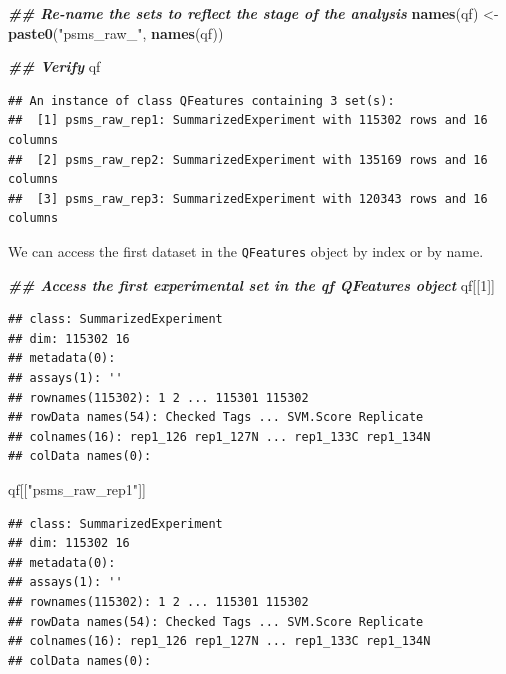 \documentclass[9pt,a4paper,]{extarticle}
\newenvironment{Shaded}{\begin{snugshade}}{\end{snugshade}}
\newcommand{\DecValTok}[1]{\textcolor[rgb]{0.00,0.00,0.81}{#1}}
\newcommand{\DocumentationTok}[1]{\textcolor[rgb]{0.56,0.35,0.01}{\textbf{\textit{#1}}}}
\newcommand{\FunctionTok}[1]{\textcolor[rgb]{0.13,0.29,0.53}{\textbf{#1}}}
\newcommand{\NormalTok}[1]{#1}
\newcommand{\OtherTok}[1]{\textcolor[rgb]{0.56,0.35,0.01}{#1}}
\newcommand{\StringTok}[1]{\textcolor[rgb]{0.31,0.60,0.02}{#1}}
\begin{document}
\begin{Shaded}
\begin{Highlighting}[]
\DocumentationTok{\#\# Re{-}name the sets to reflect the stage of the analysis              }
\FunctionTok{names}\NormalTok{(qf) }\OtherTok{\textless{}{-}} \FunctionTok{paste0}\NormalTok{(}\StringTok{"psms\_raw\_"}\NormalTok{, }\FunctionTok{names}\NormalTok{(qf))}


\DocumentationTok{\#\# Verify}
\NormalTok{qf}
\end{Highlighting}
\end{Shaded}

\begin{verbatim}
## An instance of class QFeatures containing 3 set(s):
##  [1] psms_raw_rep1: SummarizedExperiment with 115302 rows and 16 columns 
##  [2] psms_raw_rep2: SummarizedExperiment with 135169 rows and 16 columns 
##  [3] psms_raw_rep3: SummarizedExperiment with 120343 rows and 16 columns
\end{verbatim}

We can access the first dataset in the \texttt{QFeatures} object by index or by name.

\begin{Shaded}
\begin{Highlighting}[]
\DocumentationTok{\#\# Access the first experimental set in the \textasciigrave{}qf\textasciigrave{} QFeatures object}
\NormalTok{qf[[}\DecValTok{1}\NormalTok{]]}
\end{Highlighting}
\end{Shaded}

\begin{verbatim}
## class: SummarizedExperiment 
## dim: 115302 16 
## metadata(0):
## assays(1): ''
## rownames(115302): 1 2 ... 115301 115302
## rowData names(54): Checked Tags ... SVM.Score Replicate
## colnames(16): rep1_126 rep1_127N ... rep1_133C rep1_134N
## colData names(0):
\end{verbatim}

\begin{Shaded}
\begin{Highlighting}[]
\NormalTok{qf[[}\StringTok{"psms\_raw\_rep1"}\NormalTok{]]}
\end{Highlighting}
\end{Shaded}

\begin{verbatim}
## class: SummarizedExperiment 
## dim: 115302 16 
## metadata(0):
## assays(1): ''
## rownames(115302): 1 2 ... 115301 115302
## rowData names(54): Checked Tags ... SVM.Score Replicate
## colnames(16): rep1_126 rep1_127N ... rep1_133C rep1_134N
## colData names(0):
\end{verbatim}
\end{document}
